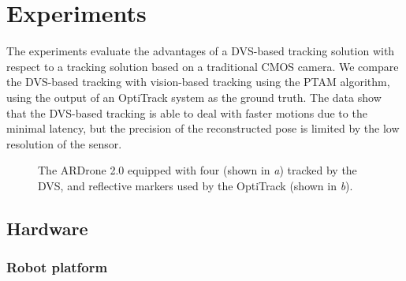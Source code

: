 
\section{Experiments\label{sec:experiments}}

The experiments evaluate the advantages of a DVS-based tracking solution
with respect to a tracking solution based on a traditional CMOS camera.
We compare the DVS-based \ALM tracking with vision-based tracking
using the PTAM algorithm, using the output of an OptiTrack system
as the ground truth. The data show that the DVS-based tracking is
able to deal with faster motions due to the minimal latency, but the
precision of the reconstructed pose is limited by the low resolution
of the sensor.



\begin{figure}[b]
\centering{}\hfill{}\hfill{}\hfill{} \caption{\label{fig:marked_quadrotor}The ARDrone 2.0 equipped with four \ALMs
(shown in \emph{a}) tracked by the DVS, and reflective markers used
by the OptiTrack (shown in \emph{b}). }
\end{figure}



\subsection{Hardware}


\subsubsection{Robot platform}

